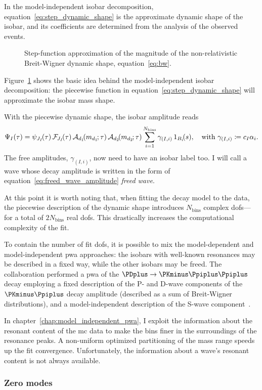     In the model-independent isobar decomposition, equation~\eqref{eq:step_dynamic_shape} is the approximate dynamic shape of the isobar, and its coefficients are determined from the analysis of the observed events.
    \begin{figure}
        \centering
        
        \caption{Step-function approximation of the magnitude of the non-relativistic Breit-Wigner dynamic shape, equation~\eqref{eq:bw}.}
        \label{fig:step_function_approximation}
    \end{figure}
    Figure~\ref{fig:step_function_approximation} shows the basic idea behind the model-independent isobar decomposition: the piecewise function in equation~\eqref{eq:step_dynamic_shape} will approximate the isobar mass shape.


    With the piecewise dynamic shape, the isobar amplitude reads
    \begin{equation}\label{eq:freed_wave_amplitude}
        \Psi_I(\tau) = \psi_{J_I\!}(\tau)\,\mathcal{F\!}_{J_I\!}(\tau)\,\A_{d_1}\!(m_{d_1\!}; \tau)\,\A_{d_2}\!(m_{d_2\!}; \tau) \sum_{i=1}^{N_\text{bins}} \gamma_{(I,i)}\, \Characteristic_{B_i}\!(s),
        \quad
        \text{with }
        \gamma_{(I,i)} \coloneqq c_I \alpha_i. 
    \end{equation}
    The free amplitudes, $\gamma_{(I,i)}$, now need to have an isobar label too.
    I will call a wave whose decay amplitude is written in the form of equation~\eqref{eq:freed_wave_amplitude} \emph{freed wave}.


    At this point it is worth noting that, when fitting the decay model to the data, the piecewise description of the dynamic shape introduces $N_\text{bins}$ complex \acp{dof}---for a total of $2N_{\text{bins}}$ real \acp{dof}.
    This drastically increases the computational complexity of the fit.


    To contain the number of fit \acp{dof}, it is possible to mix the model-dependent and model-independent \ac{pwa} approaches: the isobars with well-known resonances may be described in a fixed way, while the other isobars may be freed.
    The \focus{} collaboration performed a \ac{pwa} of the $\PDplus \to \PKminus\Ppiplus\Ppiplus$ decay employing a fixed description of the P- and D-wave components of the $\PKminus\Ppiplus$ decay amplitude (described as a sum of Breit-Wigner distributions), and a model-independent description of the S-wave component~\cite{Link200914}.


    In chapter~\ref{chap:model_independent_pwa}, I exploit the information about the resonant content of the \ac{mc} data to make the bins finer in the surroundings of the resonance peaks.
    A non-uniform optimized partitioning of the mass range speeds up the fit convergence.
    Unfortunately, the information about a wave's resonant content is not always available.


        \subsubsection{Zero modes}
        
